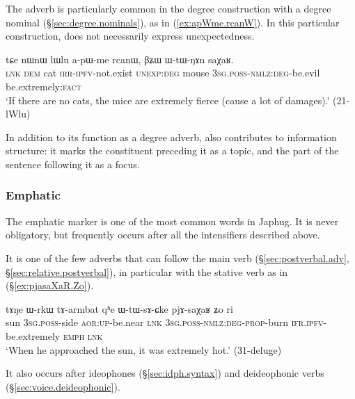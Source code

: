 The adverb  is particularly common in the degree construction with a  degree nominal (§\ref{sec:degree.nominals}), as in (\ref{ex:apWme.rcanW}). In this particular construction,   does not necessarily express unexpectedness.

\begin{exe}
	\ex \label{ex:apWme.rcanW}
	\gll  tɕe nɯnɯ lɯlu a-pɯ-me rcanɯ, βʑɯ ɯ-tɯ-ŋɤn saχaʁ. \\
	\textsc{lnk} \textsc{dem} cat \textsc{irr}-\textsc{ipfv}-not.exist \textsc{unexp}:\textsc{deg} mouse
	\textsc{3sg}.\textsc{poss}-\textsc{nmlz}:\textsc{deg}-be.evil be.extremely:\textsc{fact} \\ 
	\glt `If there are no cats, the mice are extremely fierce (cause a lot of damages).' (21-lWlu) 
\end{exe}

In addition to its function as a degree adverb,   also contributes to information structure: it marks the constituent preceding it as a topic, and the part of the sentence following it as a focus.
 
\subsubsection{Emphatic} \label{sec:emphatic.Zo} 
The emphatic marker  is one of the most common words in Japhug. It is never obligatory, but frequently occurs after all the intensifiers described above. 

It is one of the few adverbs that can follow the main verb (§\ref{sec:postverbal.adv}, §\ref{sec:relative.postverbal}), in particular with the stative verb  as in (§\ref{ex:pjasaXaR.Zo}).

\begin{exe}
	\ex \label{ex:pjasaXaR.Zo}
	\gll tɤŋe ɯ-rkɯ tɤ-armbat qʰe ɯ-tɯ-sɤ-ɕke pjɤ-saχaʁ ʑo ri \\
	sun \textsc{3sg}.\textsc{poss}-side \textsc{aor}:\textsc{up}-be.near \textsc{lnk} \textsc{3sg}.\textsc{poss}-\textsc{nmlz}:\textsc{deg}-\textsc{prop}-burn \textsc{ifr}.\textsc{ipfv}-be.extremely \textsc{emph} \textsc{lnk} \\
	\glt `When he approached the sun, it was extremely hot.' (31-deluge)
	\end{exe}
	
It also occurs after ideophones (§\ref{sec:idph.syntax}) and deideophonic verbs (§\ref{sec:voice.deideophonic}).

